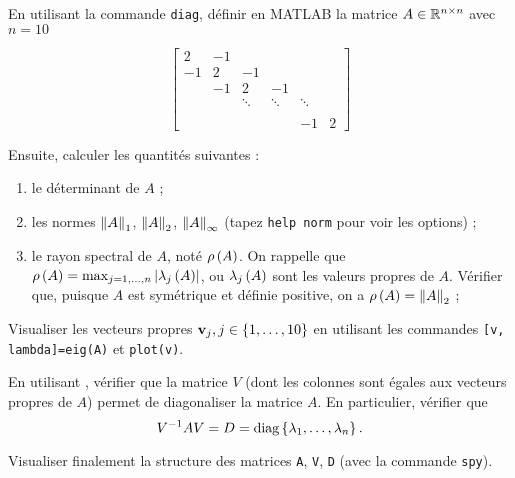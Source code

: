 En utilisant la commande \texttt{diag}, définir en \textsc{MATLAB} la matrice $A \in \mathbb{R}^{n \times n}$ avec $n = 10$

\begin{equation*}
  \begin{bmatrix}
      2   & -1  &         &         &         &    \\
      -1  & 2   & -1      &         &         &    \\
          & -1  & 2       & -1      &         &    \\
          &     & \ddots  & \ddots  & \ddots  &     \\
          &     &         &         &         &    \\
          &     &         &         &    -1   &  2  
    \end{bmatrix}
\end{equation*}


Ensuite, calculer les quantités suivantes :
\begin{enumerate}[label=\alph*)]
  \item le déterminant de $A$ ;
  \item les normes $\left\lVert A\right\rVert_{1}$, $\left\lVert A\right\rVert_{2}$, $\left\lVert A\right\rVert_{\infty}$ (tapez \texttt{help norm} pour voir les options) ;
  \item le rayon spectral de $A$, noté $\rho \left(A\right)$. On rappelle que $\rho \left(A\right) = \max_{j = 1, \dots, n} \left\lvert\lambda_{j} \left(A\right)\right\rvert$, ou $\lambda_{j} \left(A\right)$ sont les valeurs propres de $A$. Vérifier que, puisque $A$ est symétrique et définie positive, on a $\rho \left(A\right) = \left\lVert A\right\rVert_{2}$ ;
\end{enumerate}

Visualiser les vecteurs propres $\mathbf{v}_{j}, j \in \left\{1, \dots, 10\right\}$ en utilisant les commandes \texttt{[v, lambda]=eig(A)} et \texttt{plot(v)}.


En utilisant \MAT, vérifier que la matrice $V$ (dont les colonnes sont égales aux vecteurs propres de $A$) permet de diagonaliser la matrice $A$. En particulier, vérifier que
\begin{equation*}
  V^{-1} A V = D = \text{diag} \left\{\lambda_{1}, \dots, \lambda_{n}\right\}.
\end{equation*}


Visualiser finalement la structure des matrices \texttt{A}, \texttt{V}, \texttt{D} (avec la commande \texttt{spy}).

